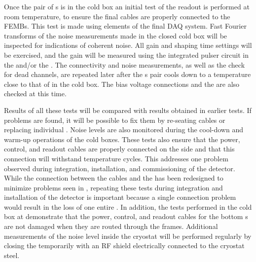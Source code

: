 Once the pair of s is in the cold box an initial test of the readout is performed at room temperature, to ensure the final cables are
properly connected to the FEMBs. This test is made using elements of the final DAQ system.
Fast Fourier transforms of
the noise measurements made in the closed cold box will be inspected for indications
of coherent noise. All  gain and shaping time settings will be exercised,
and the gain will be measured using the integrated pulser circuit in the 
 and/or the . The connectivity and noise measurements, as well
as the check for dead channels, are repeated later after the s pair cools
down to a temperature close to that of \lntwo in the cold box. The bias voltage
connections and the  are also checked at this time.

Results of all these tests will be compared with results obtained 
in earlier  tests.  If problems are found, it will be possible 
to fix them by re-seating cables or replacing individual .
Noise levels are also monitored during the cool-down and warm-up 
operations of the cold boxes. These tests also ensure that the power,
control, and readout cables are properly connected
on the  side and that this connection will withstand temperature 
cycles. This addresses one problem observed during integration,
installation, and commissioning of the   
detector. While the connection between the cables and the 
has been redesigned to minimize problems seen in ,
repeating these tests during integration
and installation of the detector is important because a single connection problem would
result in the loss of one entire . In addition, the tests 
performed in the cold box at  demonstrate that the power, control, and
readout cables for the bottom s are not damaged when they are routed 
through the  frames. Additional measurements of the noise
level inside the cryostat will be performed regularly by closing 
the  temporarily with an RF shield electrically connected 
to the cryostat steel. 

